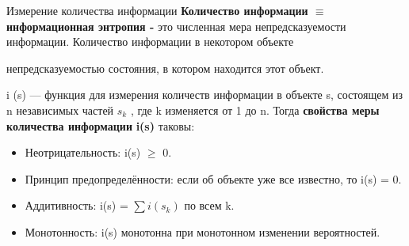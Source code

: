 \begin{frame}{Измерение количества информации}
\noindent\color[rgb]{0,0.7,0.4}\textbf{Количество информации $\equiv$ информационная энтропия  - }
\color{black}
это численная мера
непредсказуемости информации. Количество информации в некотором объекте

 непредсказуемостью состояния, в котором находится этот объект.

 i (s) — функция для измерения количеств информации в объекте s, состоящем из n
независимых частей $s_k$
, где k изменяется от 1 до n. Тогда 
\color[rgb]{0,0.7,0.4}\textbf{свойства меры количества информации}
\color{black}
\textbf{i(s)} таковы:

\begin{itemize}
	\item[\textbullet] Неотрицательность: i(s) $\geq$ 0.
	\item[\textbullet] Принцип предопределённости: если об объекте уже все известно, то i(s) = 0.
	\item[\textbullet] Аддитивность: i(s) = $\sum i(s_k)$ по всем k.
	\item[\textbullet] Монотонность: i(s) монотонна при монотонном изменении вероятностей.
\end{itemize}

\end{frame}